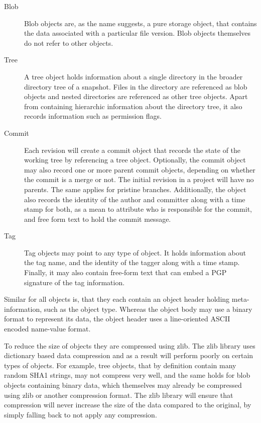 \begin{description}

\item[Blob]
%
	Blob objects are, as the name suggests, a pure storage object,
	that contains the data associated with a particular file
	version. Blob objects themselves do not refer to other
	objects.

\item[Tree]
%
	A tree object holds information about a single directory in
	the broader directory tree of a snapshot. Files in the directory are
	referenced as blob objects and nested directories are
	referenced as other tree objects. Apart from containing
	hierarchic information about the directory tree, it also
	records information such as permission flags.

\item[Commit]
%
	Each revision will create a commit object that records the
	state of the working tree by referencing a tree object.
	Optionally, the commit object may also record one or more
	parent commit objects, depending on whether the commit is a
	merge or not. The initial revision in a project will have no
	parents. The same applies for pristine branches. Additionally,
	the object also records the identity of the author and
	committer along with a time stamp for both, as a mean to
	attribute who is responsible for the commit, and free form
	text to hold the commit message.

\item[Tag]
%
	Tag objects may point to any type of object. It holds
	information about the tag name, and the identity of the tagger
	along with a time stamp. Finally, it may also contain free-form
	text that can embed a PGP signature of the tag information.

\end{description}

Similar for all objects is, that they each contain an object header
holding meta-information, such as the object type. Whereas the object
body may use a binary format to represent its data, the object header
uses a line-oriented ASCII encoded name-value format.


To reduce the size of objects they are compressed using zlib.  The
zlib library uses dictionary based data compression and as a result
will perform poorly on certain types of objects. For example, tree
objects, that by definition contain many random SHA1 strings, may not
compress very well, and the same holds for blob objects containing
binary data, which themselves may already be compressed using zlib or
another compression format. The zlib library will ensure that
compression will never increase the size of the data compared to the
original, by simply falling back to not apply any compression.

